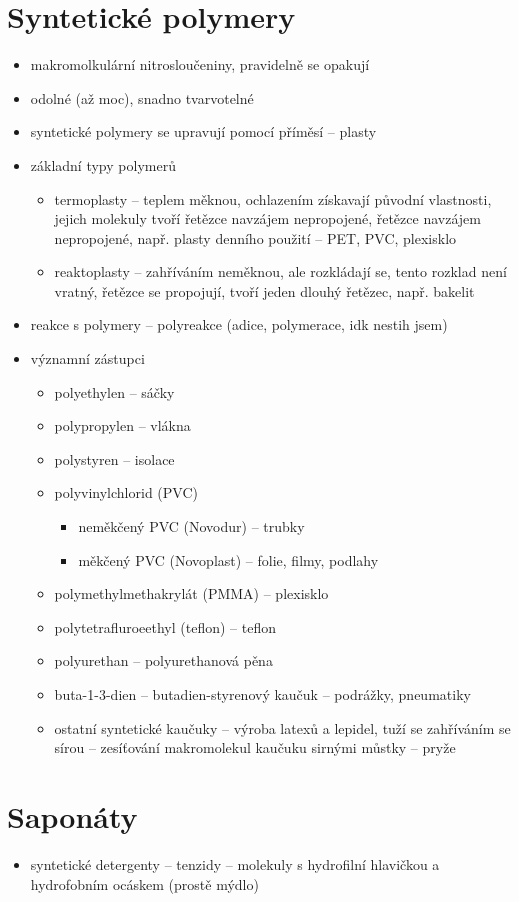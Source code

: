 \documentclass{article}
\begin{document}
\part{Syntetické polymery}
\begin{itemize}
  \item makromolkulární nitrosloučeniny, pravidelně se opakují
  \item odolné (až moc), snadno tvarvotelné
  \item syntetické polymery se upravují pomocí příměsí -- plasty
  \item základní typy polymerů
  \begin{itemize}
    \item termoplasty -- teplem měknou, ochlazením získavají původní vlastnosti, jejich molekuly tvoří řetězce navzájem nepropojené, řetězce navzájem nepropojené, např. plasty denního použití -- PET, PVC, plexisklo
    \item reaktoplasty -- zahříváním neměknou, ale rozkládají se, tento rozklad není vratný, řetězce se propojují, tvoří jeden dlouhý řetězec, např. bakelit
  \end{itemize}
  \item reakce s polymery -- polyreakce (adice, polymerace, idk nestih jsem)
  \item významní zástupci
  \begin{itemize}
    \item polyethylen -- sáčky
    \item polypropylen -- vlákna
    \item polystyren -- isolace
    \item polyvinylchlorid (PVC)
    \begin{itemize}
      \item neměkčený PVC (Novodur) -- trubky
      \item měkčený PVC (Novoplast) -- folie, filmy, podlahy
    \end{itemize}
    \item polymethylmethakrylát (PMMA) -- plexisklo
    \item polytetrafluroeethyl (teflon) -- teflon
    \item polyurethan -- polyurethanová pěna
    \item buta-1-3-dien -- butadien-styrenový kaučuk -- podrážky, pneumatiky
    \item ostatní syntetické kaučuky -- výroba latexů a lepidel, tuží se zahříváním se sírou -- zesíťování makromolekul kaučuku sirnými můstky -- pryže
  \end{itemize}
\end{itemize}

\part{Saponáty}
\begin{itemize}
  \item syntetické detergenty -- tenzidy -- molekuly s hydrofilní hlavičkou a hydrofobním ocáskem (prostě mýdlo)
\end{itemize}
\end{document}
